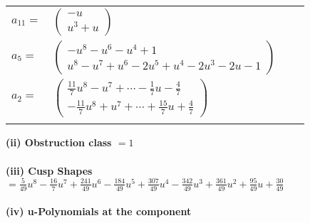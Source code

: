 \documentclass[1p]{elsarticle_modified}
\theoremstyle{definition}
\begin{document}
\begin{tabular}{m{7pt} m{180pt} m{7pt} m{180pt} }
\flushright $a_{11}=$&$\begin{pmatrix}- u\\u^3+u\end{pmatrix}$ \\
\flushright $a_{5}=$&$\begin{pmatrix}- u^8- u^6- u^4+1\\u^8- u^7+u^6-2 u^5+u^4-2 u^3-2 u-1\end{pmatrix}$ \\
\flushright $a_{2}=$&$\begin{pmatrix}\frac{11}{7} u^8- u^7+\cdots-\frac{1}{7} u-\frac{4}{7}\\-\frac{11}{7} u^8+u^7+\cdots+\frac{15}{7} u+\frac{4}{7}\end{pmatrix}$\\&\end{tabular}
\flushleft \textbf{(ii) Obstruction class $= 1$}\\~\\
\flushleft \textbf{(iii) Cusp Shapes $= \frac{5}{49} u^8-\frac{16}{7} u^7+\frac{241}{49} u^6-\frac{184}{49} u^5+\frac{307}{49} u^4-\frac{342}{49} u^3+\frac{361}{49} u^2+\frac{95}{49} u+\frac{30}{49}$}\\~\\
\newpage\renewcommand{\arraystretch}{1}
\flushleft \textbf{(iv) u-Polynomials at the component}\newline \\
\end{document}
